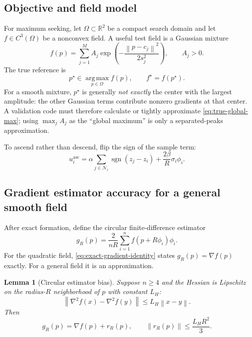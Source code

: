 \documentclass[11pt]{article}
\newtheorem{lemma}[theorem]{Lemma}
\newcommand{\R}{\mathbb{R}}
\newcommand{\N}{\mathcal{N}}
\newcommand{\sgn}{\operatorname{sgn}}
\newcommand{\argmax}{\operatorname*{arg\,max}}
\newcommand{\norm}[1]{\left\lVert #1\right\rVert}
\begin{document}
\subsection{Objective and field model}

For maximum seeking, let $\Omega\subset\R^2$ be a compact search domain and let $f\in C^3(\Omega)$ be a nonconvex field. A useful test field is a Gaussian mixture
\begin{equation}\label{eq:gaussian-mixture}
    f(p)=\sum_{j=1}^M A_j\exp\left(-\frac{\norm{p-c_j}^2}{2s_j^2}\right),
    \qquad A_j>0.
\end{equation}
The true reference is
\begin{equation}\label{eq:true-global-max}
    p^\star\in\argmax_{p\in\Omega} f(p),\qquad f^\star=f(p^\star).
\end{equation}
For a smooth mixture, $p^\star$ is generally \emph{not exactly} the center with the largest amplitude: the other Gaussian terms contribute nonzero gradients at that center. A validation code must therefore calculate or tightly approximate \eqref{eq:true-global-max}; using $\max_jA_j$ as the ``global maximum'' is only a separated-peaks approximation.

To ascend rather than descend, flip the sign of the sample term:
\begin{equation}\label{eq:ascent-controller}
    u_i^{\mathrm{asc}}=
    \alpha\sum_{j\in\N_i}\sgn(z_j-z_i)
    +\frac{2\beta}{R}\sigma_i\phi_i.
\end{equation}

\subsection{Gradient estimator accuracy for a general smooth field}\label{sec:gradient-estimator}

After exact formation, define the circular finite-difference estimator
\begin{equation}\label{eq:gradient-estimator}
    g_R(p)=\frac{2}{nR}\sum_{i=1}^nf(p+R\phi_i)\phi_i.
\end{equation}
For the quadratic field, \cref{eq:exact-gradient-identity} states $g_R(p)=\nabla f(p)$ exactly. For a general field it is an approximation.

\begin{lemma}[Circular estimator bias]\label{lem:estimator-bias}
Suppose $n\geq4$ and the Hessian is Lipschitz on the radius-$R$ neighborhood of $p$ with constant $L_H$:
\begin{equation*}
    \norm{\nabla^2f(x)-\nabla^2f(y)}\leq L_H\norm{x-y}.
\end{equation*}
Then
\begin{equation}\label{eq:estimator-bias}
    g_R(p)=\nabla f(p)+r_R(p),
    \qquad \norm{r_R(p)}\leq\frac{L_HR^2}{3}.
\end{equation}
\end{lemma}
\end{document}

